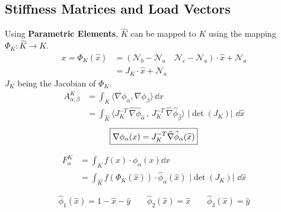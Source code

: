 \subsection{Stiffness Matrices and Load Vectors}
    Using \textbf{Parametric Elements}, $\widehat{K}$ can be mapped to $K$ using the mapping $\Phi_K: \widehat{K} \to K$.
    \begin{align*}
        x = \Phi_K(\widehat{x}) &= (\mathcal{N}_b - \mathcal{N}_a \quad \mathcal{N}_c - \mathcal{N}_a) \cdot  \widehat{x} + \mathcal{N}_a\\
                                &= J_K \cdot \widehat{x} + \mathcal{N}_a        
    \end{align*}
    $J_K$ being the Jacobian of $\Phi_K$.
        \begin{align*}
            A_{\alpha,\beta}^K &= \int_K \langle \nabla \phi_\alpha, \nabla \phi_\beta \rangle \, \dd x \\
            &=\int_{\widehat{K}} \langle J_K^{-T}\, \widehat{\nabla} \widehat{\phi}_{\widehat{\alpha}}\, , \, J_K^{-T}\, \widehat{\nabla}\widehat{\phi}_{\widehat{\beta}} \rangle \,\, \lvert \det (J_K) \rvert \,\, \dd\widehat{x} 
        \end{align*}
        $$\boxed{%
            \nabla \phi_\alpha(x) = J_K^{-T} \widehat{\nabla}\widehat{\phi}_\alpha(\widehat{x})
        }$$
            
        \begin{align*}
            F_\alpha^K &= \int_K f(x) \cdot \phi_\alpha(x) \dd x \\
            &= \int_{\widehat{K}} f(\Phi_K(\widehat{x})) \cdot \widehat{\phi}_\alpha(\widehat{x})\,\, \lvert \det(J_K) \rvert \,\, \dd \widehat{x}
        \end{align*}

        \vspace{0.5em}
        $$
        \widehat{\phi}_1(\widehat{x}) = 1 - \widehat{x} - \widehat{y} \qquad \widehat{\phi}_2(\widehat{x}) = \widehat{x} \qquad \widehat{\phi}_3(\widehat{x}) = \widehat{y}
        $$
        \vspace{-1.5em}